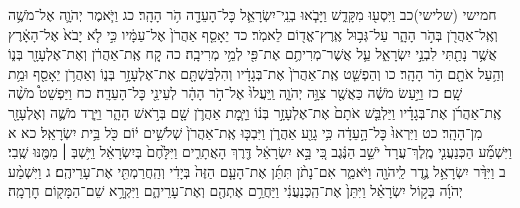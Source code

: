 \documentclass[twoside, openany, parskip=half, 11pt]{book}
\begin{document}
חמישי (שלישי)כב וַיִּסְע֖וּ מִקָּדֵ֑שׁ וַיָּבֹ֧אוּ בְנֵֽי־יִשְׂרָאֵ֛ל כׇּל־הָעֵדָ֖ה הֹ֥ר הָהָֽר׃ כג וַיֹּ֧אמֶר יְהֹוָ֛ה אֶל־מֹשֶׁ֥ה וְאֶֽל־אַהֲרֹ֖ן בְּהֹ֣ר הָהָ֑ר עַל־גְּב֥וּל אֶֽרֶץ־אֱד֖וֹם לֵאמֹֽר׃ כד יֵאָסֵ֤ף אַהֲרֹן֙ אֶל־עַמָּ֔יו כִּ֣י לֹ֤א יָבֹא֙ אֶל־הָאָ֔רֶץ אֲשֶׁ֥ר נָתַ֖תִּי לִבְנֵ֣י יִשְׂרָאֵ֑ל עַ֛ל אֲשֶׁר־מְרִיתֶ֥ם אֶת־פִּ֖י לְמֵ֥י מְרִיבָֽה׃ כה קַ֚ח אֶֽת־אַהֲרֹ֔ן וְאֶת־אֶלְעָזָ֖ר בְּנ֑וֹ וְהַ֥עַל אֹתָ֖ם הֹ֥ר הָהָֽר׃ כו וְהַפְשֵׁ֤ט אֶֽת־אַהֲרֹן֙ אֶת־בְּגָדָ֔יו וְהִלְבַּשְׁתָּ֖ם אֶת־אֶלְעָזָ֣ר בְּנ֑וֹ וְאַהֲרֹ֥ן יֵאָסֵ֖ף וּמֵ֥ת שָֽׁם׃ כז וַיַּ֣עַשׂ מֹשֶׁ֔ה כַּאֲשֶׁ֖ר צִוָּ֣ה יְהֹוָ֑ה וַֽיַּעֲלוּ֙ אֶל־הֹ֣ר הָהָ֔ר לְעֵינֵ֖י כׇּל־הָעֵדָֽה׃ כח וַיַּפְשֵׁט֩ מֹשֶׁ֨ה אֶֽת־אַהֲרֹ֜ן אֶת־בְּגָדָ֗יו וַיַּלְבֵּ֤שׁ אֹתָם֙ אֶת־אֶלְעָזָ֣ר בְּנ֔וֹ וַיָּ֧מׇת אַהֲרֹ֛ן שָׁ֖ם בְּרֹ֣אשׁ הָהָ֑ר וַיֵּ֧רֶד מֹשֶׁ֛ה וְאֶלְעָזָ֖ר מִן־הָהָֽר׃ כט וַיִּרְאוּ֙ כׇּל־הָ֣עֵדָ֔ה כִּ֥י גָוַ֖ע אַהֲרֹ֑ן וַיִּבְכּ֤וּ אֶֽת־אַהֲרֹן֙ שְׁלֹשִׁ֣ים י֔וֹם כֹּ֖ל בֵּ֥ית יִשְׂרָאֵֽל׃
כא א וַיִּשְׁמַ֞ע הַכְּנַעֲנִ֤י מֶֽלֶךְ־עֲרָד֙ יֹשֵׁ֣ב הַנֶּ֔גֶב כִּ֚י בָּ֣א יִשְׂרָאֵ֔ל דֶּ֖רֶךְ הָאֲתָרִ֑ים וַיִּלָּ֙חֶם֙ בְּיִשְׂרָאֵ֔ל וַיִּ֥שְׁבְּ ׀ מִמֶּ֖נּוּ שֶֽׁבִי׃ ב וַיִּדַּ֨ר יִשְׂרָאֵ֥ל נֶ֛דֶר לַֽיהֹוָ֖ה וַיֹּאמַ֑ר אִם־נָתֹ֨ן תִּתֵּ֜ן אֶת־הָעָ֤ם הַזֶּה֙ בְּיָדִ֔י וְהַֽחֲרַמְתִּ֖י אֶת־עָרֵיהֶֽם׃ ג וַיִּשְׁמַ֨ע יְהֹוָ֜ה בְּק֣וֹל יִשְׂרָאֵ֗ל וַיִּתֵּן֙ אֶת־הַֽכְּנַעֲנִ֔י וַיַּחֲרֵ֥ם אֶתְהֶ֖ם וְאֶת־עָרֵיהֶ֑ם וַיִּקְרָ֥א שֵׁם־הַמָּק֖וֹם חׇרְמָֽה׃
\end{document}
